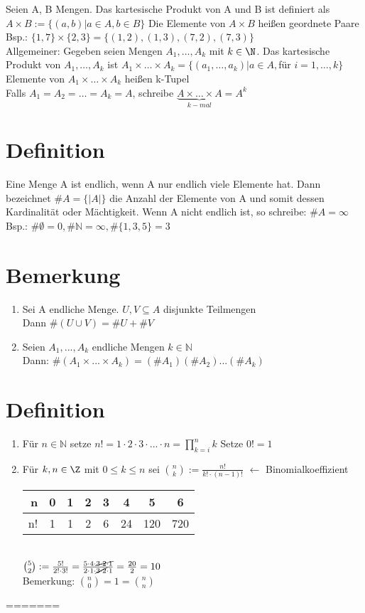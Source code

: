 \Def
Seien A, B Mengen. Das kartesische Produkt von A und B ist definiert als $A × B := \{(a,b)|a\in A, b \in B\}$ Die Elemente von $A × B$ heißen geordnete Paare\\
Bsp.: $\{1,7\}\times \{2,3\}=\{(1,2),(1,3),(7,2),(7,3)\}$\\
Allgemeiner: Gegeben seien Mengen
$A_1,…,A_k$ mit $k \in \N$. Das kartesische Produkt von $A_1,…,A_k$ ist $A_1\times …\times A_k = \{(a_1,…,a_k)|a\in A, $für $i=1,…,k\}$\\
Elemente von $A_1 × … × A_k$ heißen k-Tupel\\
Falls $A_1=A_2=…=A_k=A$, schreibe $\underbrace{A\times…\times A}_{k-mal}=A^k$

\section{Definition}
Eine Menge A ist endlich, wenn A nur endlich viele Elemente hat. Dann bezeichnet
$\#A = \{|A|\}$ die Anzahl der Elemente von A und somit dessen Kardinalit\"at
oder M\"achtigkeit. Wenn A nicht endlich ist, so schreibe: $\# A= \infty$\\
Bsp.: $\#\emptyset = 0, \#\mathds{N}=\infty, \# \{1,3,5\} = 3$

\section{Bemerkung}
\begin{enumerate}
\item Sei A endliche Menge. $U,V\subseteq A$ disjunkte Teilmengen\\
Dann $\#(U\cup V)=\# U + \# V$ 
\item Seien $A_1,...,A_k$ endliche Mengen $k \in \mathds{N}$\\
Dann: $\#(A_1 \times ... \times A_k)=(\#A_1)(\#A_2)...(\#A_k)$
\end{enumerate}

\section{Definition}
\begin{enumerate}
\item Für $n\in \mathds{N}$ setze $n!=1\cdot 2\cdot 3\cdot ... \cdot n=\prod_{k=i}^n k$
Setze $0!=1$
\item Für $k,n\in \Z$ mit $0\le k \le n$ sei ${n \choose k} := \frac{n!}{k!\cdot(n-1)!}$ $\leftarrow$ Binomialkoeffizient\\
\begin{tabular}{r|c|c|c|c|c|c|c}
n & 0 & 1 & 2 & 3 & 4 & 5 & 6\\ \hline
n! & 1 & 1 & 2 & 6 & 24 & 120 & 720
\end{tabular}\\
\bsp
${5 \choose 2} := \frac{5!}{2!\cdot 3!} = \frac{5\cdot 4 \cdot\cancel{3 \cdot 2 \cdot 1}}{2\cdot 1\cdot \cancel{3\cdot 2}\cdot 1 } = \frac{20}{2}=10$\\
Bemerkung: ${ n \choose 0 }= 1 = {n \choose n}$
\end{enumerate}
=======

